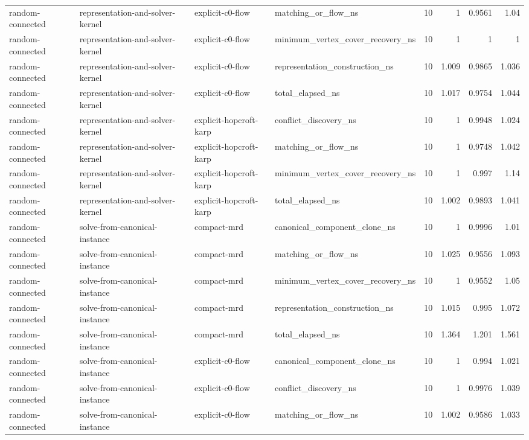 \begin{table}[t]
\begin{tabular}{llllrrrr}
random-connected & representation-and-solver-kernel & explicit-c0-flow & matching\_or\_flow\_ns & 10 & 1 & 0.9561 & 1.04 \\
random-connected & representation-and-solver-kernel & explicit-c0-flow & minimum\_vertex\_cover\_recovery\_ns & 10 & 1 & 1 & 1 \\
random-connected & representation-and-solver-kernel & explicit-c0-flow & representation\_construction\_ns & 10 & 1.009 & 0.9865 & 1.036 \\
random-connected & representation-and-solver-kernel & explicit-c0-flow & total\_elapsed\_ns & 10 & 1.017 & 0.9754 & 1.044 \\
random-connected & representation-and-solver-kernel & explicit-hopcroft-karp & conflict\_discovery\_ns & 10 & 1 & 0.9948 & 1.024 \\
random-connected & representation-and-solver-kernel & explicit-hopcroft-karp & matching\_or\_flow\_ns & 10 & 1 & 0.9748 & 1.042 \\
random-connected & representation-and-solver-kernel & explicit-hopcroft-karp & minimum\_vertex\_cover\_recovery\_ns & 10 & 1 & 0.997 & 1.14 \\
random-connected & representation-and-solver-kernel & explicit-hopcroft-karp & total\_elapsed\_ns & 10 & 1.002 & 0.9893 & 1.041 \\
random-connected & solve-from-canonical-instance & compact-mrd & canonical\_component\_clone\_ns & 10 & 1 & 0.9996 & 1.01 \\
random-connected & solve-from-canonical-instance & compact-mrd & matching\_or\_flow\_ns & 10 & 1.025 & 0.9556 & 1.093 \\
random-connected & solve-from-canonical-instance & compact-mrd & minimum\_vertex\_cover\_recovery\_ns & 10 & 1 & 0.9552 & 1.05 \\
random-connected & solve-from-canonical-instance & compact-mrd & representation\_construction\_ns & 10 & 1.015 & 0.995 & 1.072 \\
random-connected & solve-from-canonical-instance & compact-mrd & total\_elapsed\_ns & 10 & 1.364 & 1.201 & 1.561 \\
random-connected & solve-from-canonical-instance & explicit-c0-flow & canonical\_component\_clone\_ns & 10 & 1 & 0.994 & 1.021 \\
random-connected & solve-from-canonical-instance & explicit-c0-flow & conflict\_discovery\_ns & 10 & 1 & 0.9976 & 1.039 \\
random-connected & solve-from-canonical-instance & explicit-c0-flow & matching\_or\_flow\_ns & 10 & 1.002 & 0.9586 & 1.033 \\

\end{tabular}
\end{table}

